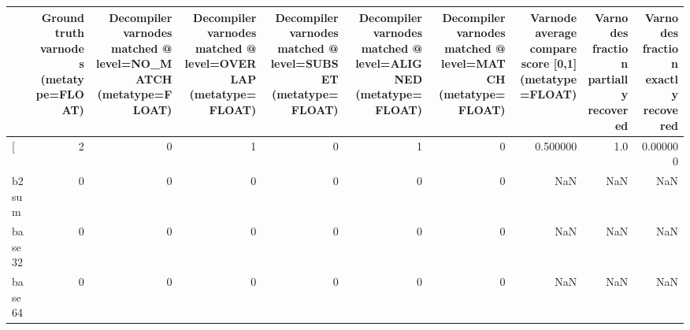 \begin{tabular}{lrrrrrrrrr}
\toprule
{} &  Ground truth varnodes (metatype=FLOAT) &  Decompiler varnodes matched @ level=NO\_MATCH (metatype=FLOAT) &  Decompiler varnodes matched @ level=OVERLAP (metatype=FLOAT) &  Decompiler varnodes matched @ level=SUBSET (metatype=FLOAT) &  Decompiler varnodes matched @ level=ALIGNED (metatype=FLOAT) &  Decompiler varnodes matched @ level=MATCH (metatype=FLOAT) &  Varnode average compare score [0,1] (metatype=FLOAT) &  Varnodes fraction partially recovered &  Varnodes fraction exactly recovered \\
\midrule
[         &                                       2 &                                                  0 &                                                  1 &                                                  0 &                                                  1 &                                                  0 &                                           0.500000 &                                    1.0 &                             0.000000 \\
b2sum     &                                       0 &                                                  0 &                                                  0 &                                                  0 &                                                  0 &                                                  0 &                                                NaN &                                    NaN &                                  NaN \\
base32    &                                       0 &                                                  0 &                                                  0 &                                                  0 &                                                  0 &                                                  0 &                                                NaN &                                    NaN &                                  NaN \\
base64    &                                       0 &                                                  0 &                                                  0 &                                                  0 &                                                  0 &                                                  0 &                                                NaN &                                    NaN &                                  NaN \\

\end{tabular}
